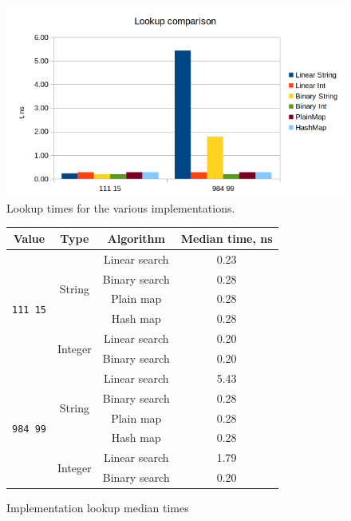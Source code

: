 \documentclass[a4paper,11pt]{article}
\begin{document}
    \begin{figure}[H]
        \centering
        \includegraphics[width=\textwidth]{lookups.png}
        \caption{Lookup times for the various implementations.}
        \label{fig:lookups}
    \end{figure}

    \begin{figure}[H]
        \centering
        
        \begin{tabular}{c|c|c|c}
            \textbf{Value} & \textbf{Type} & \textbf{Algorithm} & \textbf{Median time, ns} \\
            \hline
            \hline
            \multirow{6}{*}{\texttt{111 15}} & \multirow{4}{*}{String} & Linear search & 0.23 \\
            & & Binary search & 0.28 \\
            & & Plain map & 0.28 \\
            & & Hash map & 0.28 \\
            \cline{2-4}
            & \multirow{2}{*}{Integer} & Linear search & 0.20 \\
            & & Binary search & 0.20 \\
            \hline
            \multirow{6}{*}{\texttt{984 99}} & \multirow{4}{*}{String} & Linear search & 5.43 \\
            & & Binary search & 0.28 \\
            & & Plain map & 0.28 \\
            & & Hash map & 0.28 \\
            \cline{2-4}
            & \multirow{2}{*}{Integer} & Linear search & 1.79 \\
            & & Binary search & 0.20 \\
        \end{tabular}

        \caption{Implementation lookup median times}
        \label{fig:lookup-table}
    \end{figure}
\end{document}
